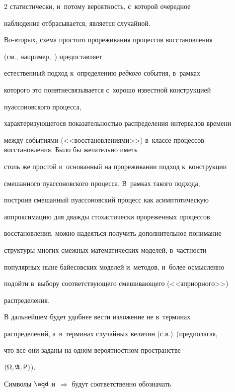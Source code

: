 \begin{multicols}{2}
статистически, и~потому вероятность, с~которой очередное


наблюдение отбрасывается, является случайной.





Во-вторых, схема простого прореживания процессов восстановления


(см., например,~\cite{Renyi1956-k, Mogyorodi1971}) предос\-тав\-ля\-ет


естественный подход к~определению \textit{редкого} события, в~рамках


которого это понятие\linebreak связыва\-ется с~хорошо известной конструкцией


пуассоновского процесса, 


характеризующегося показательностью распределения интервалов времени


между событиями (<<восстановлениями>>) в~классе процессов восстановления. Было бы желательно иметь


столь же простой и~основанный на прореживании подход к~конструкции


смешанного пуассоновского процесса. В~рамках такого подхода,


построив смешанный пуассоновский процесс как асимптотическую


аппроксимацию для дважды стохастически прореженных процессов


восстановления, можно надеяться получить дополнительное понимание


структуры многих смежных математических моделей, в~частности


популярных ныне байесовских моделей и~методов, и~более осмысленно


подойти в~выбору соответствующего смешивающего (<<априорного>>)


распределения.





В дальнейшем будет удобнее вести изложение не в~терминах


распределений, а~в~терминах случайных величин (с.в.)\ (предполагая,


что все они заданы на одном вероятностном пространстве


$(\Omega,\mathfrak{A}, {\sf P})$).





Символы $\eqd$ и~$\Longrightarrow$ будут соответственно обозначать



\end{multicols}
